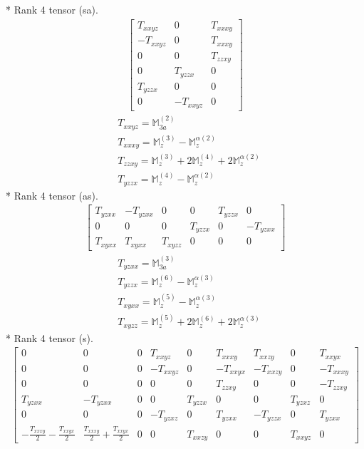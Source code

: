 \documentclass[fleqn,8pt,landscape]{jsarticle}
\begin{document}
* Rank 4 tensor (sa).
\begin{align*}
\begin{bmatrix} T_{xxyz} & 0 & T_{xxxy} \\ - T_{xxyz} & 0 & T_{xxxy} \\ 0 & 0 & T_{zzxy} \\ 0 & T_{yzzx} & 0 \\ T_{yzzx} & 0 & 0 \\ 0 & - T_{xxyz} & 0 \end{bmatrix}
\end{align*}
\begin{align*}
& T_{xxyz} = \mathbb{M}_{3a}^{(2)} \\
& T_{xxxy} = \mathbb{M}_{z}^{(3)} - \mathbb{M}_{z}^{\alpha(2)} \\
& T_{zzxy} = \mathbb{M}_{z}^{(3)} + 2 \mathbb{M}_{z}^{(4)} + 2 \mathbb{M}_{z}^{\alpha(2)} \\
& T_{yzzx} = \mathbb{M}_{z}^{(4)} - \mathbb{M}_{z}^{\alpha(2)}
\end{align*}
* Rank 4 tensor (as).
\begin{align*}
\begin{bmatrix} T_{yzxx} & - T_{yzxx} & 0 & 0 & T_{yzzx} & 0 \\ 0 & 0 & 0 & T_{yzzx} & 0 & - T_{yzxx} \\ T_{xyxx} & T_{xyxx} & T_{xyzz} & 0 & 0 & 0 \end{bmatrix}
\end{align*}
\begin{align*}
& T_{yzxx} = \mathbb{M}_{3a}^{(3)} \\
& T_{yzzx} = \mathbb{M}_{z}^{(6)} - \mathbb{M}_{z}^{\alpha(3)} \\
& T_{xyxx} = \mathbb{M}_{z}^{(5)} - \mathbb{M}_{z}^{\alpha(3)} \\
& T_{xyzz} = \mathbb{M}_{z}^{(5)} + 2 \mathbb{M}_{z}^{(6)} + 2 \mathbb{M}_{z}^{\alpha(3)}
\end{align*}
* Rank 4 tensor (s).
\begin{align*}
\begin{bmatrix} 0 & 0 & 0 & T_{xxyz} & 0 & T_{xxxy} & T_{xxzy} & 0 & T_{xxyx} \\ 0 & 0 & 0 & - T_{xxyz} & 0 & - T_{xxyx} & - T_{xxzy} & 0 & - T_{xxxy} \\ 0 & 0 & 0 & 0 & 0 & T_{zzxy} & 0 & 0 & - T_{zzxy} \\ T_{yzxx} & - T_{yzxx} & 0 & 0 & T_{yzzx} & 0 & 0 & T_{yzxz} & 0 \\ 0 & 0 & 0 & - T_{yzxz} & 0 & T_{yzxx} & - T_{yzzx} & 0 & T_{yzxx} \\ - \frac{T_{xxxy}}{2} - \frac{T_{xxyx}}{2} & \frac{T_{xxxy}}{2} + \frac{T_{xxyx}}{2} & 0 & 0 & T_{xxzy} & 0 & 0 & T_{xxyz} & 0 \end{bmatrix}
\end{align*}
\end{document}
